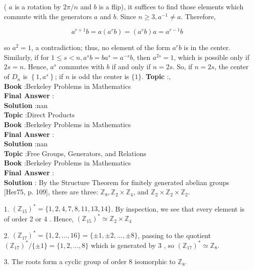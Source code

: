\documentclass[10pt]{article}
\begin{document}
( $a$ is a rotation by $2 \pi / n$ and $b$ is a flip), it suffices to find those elements which commute with the generators $a$ and $b$. Since $n \geqslant 3, a^{-1} \neq a$. Therefore,

$$
a^{r+1} b=a\left(a^{r} b\right)=\left(a^{r} b\right) a=a^{r-1} b
$$

so $a^{2}=1$, a contradiction; thus, no element of the form $a^{r} b$ is in the center. Similarly, if for $1 \leqslant s<n, a^{s} b=b a^{s}=a^{-s} b$, then $a^{2 s}=1$, which is possible only if $2 s=n$. Hence, $a^{s}$ commutes with $b$ if and only if $n=2 s$. So, if $n=2 s$, the center of $D_{n}$ is $\left\{1, a^{s}\right\}$; if $n$ is odd the center is $\{1\}$.
\textbf{Topic} :, \\
\textbf{Book} :Berkeley Problems in Mathematics\\
\textbf{Final Answer} :\\


\textbf{Solution} :nan\\
\textbf{Topic} :Direct Products \\
\textbf{Book} :Berkeley Problems in Mathematics\\
\textbf{Final Answer} :\\


\textbf{Solution} :nan\\
\textbf{Topic} :Free Groups, Generators, and Relations \\
\textbf{Book} :Berkeley Problems in Mathematics\\
\textbf{Final Answer} :\\


\textbf{Solution} : By the Structure Theorem for finitely generated abelian groups [Her75, p. 109], there are three: $\mathbb{Z}_{8}, \mathbb{Z}_{2} \times \mathbb{Z}_{4}$, and $\mathbb{Z}_{2} \times \mathbb{Z}_{2} \times \mathbb{Z}_{2}$.

1. $\left(\mathbb{Z}_{15}\right)^{*}=\{1,2,4,7,8,11,13,14\}$. By inspection, we see that every element is of order 2 or 4 . Hence, $\left(\mathbb{Z}_{15}\right)^{*} \simeq \mathbb{Z}_{2} \times \mathbb{Z}_{4}$

2. $\left(\mathbb{Z}_{17}\right)^{*}=\{1,2, \ldots, 16\}=\{\pm 1, \pm 2, \ldots, \pm 8\}$, passing to the quotient $\left(\mathbb{Z}_{17}\right)^{*} /\{\pm 1\}=\{1,2, \ldots, 8\}$ which is generated by 3 , so $\left(\mathbb{Z}_{17}\right)^{*} \simeq \mathbb{Z}_{8}$.

3. The roots form a cyclic group of order 8 isomorphic to $\mathbb{Z}_{8}$.
\end{document}

